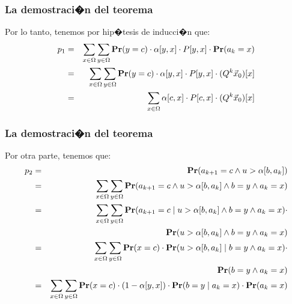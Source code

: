 \documentclass{beamer}
\newcommand{\pr}{{\rm {\bf Pr}}}
\begin{document}
	
	
	
	
	\begin{frame}
		\frametitle{La demostraci�n del teorema}
		
		{\footnotesize
			
			Por lo tanto, tenemos por hip�tesis de inducci�n que:
			\begin{eqnarray*}
				p_1 
				&=& \sum_{x\in\Omega}\sum_{y\in\Omega} \pr(y=c) \cdot 
				\alpha[y,x] \cdot P[y,x] \cdot \pr(a_k=x) \\
				&=& \sum_{x\in\Omega}\sum_{y\in\Omega} \pr(y=c) \cdot
				\alpha[y,x] \cdot P[y,x] \cdot (Q^k \vec x_0)[x] \\
				&=& \sum_{x\in\Omega} 
				\alpha[c,x] \cdot P[c,x] \cdot (Q^k \vec x_0)[x]
			\end{eqnarray*}
			
		}
		
	\end{frame}
	
	
	
	
	
	\begin{frame}
		\frametitle{La demostraci�n del teorema}
		
		{\footnotesize
			
			
			Por otra parte, tenemos que:
			\begin{eqnarray*}
				p_2 
				&=& \pr(a_{k+1}=c \wedge u > \alpha[b,a_k]) \\
				&=& \sum_{x\in\Omega}\sum_{y\in\Omega}
				\pr(a_{k+1}=c \wedge u > \alpha[b,a_k] \wedge b=y \wedge a_k=x) \\
				&=& \sum_{x\in\Omega}\sum_{y\in\Omega}
				\pr(a_{k+1}=c \mid u > \alpha[b,a_k] \wedge b=y \wedge a_k=x) \cdot\\
				&&  \hspace{121.5pt} \pr(u > \alpha[b,a_k] \wedge b=y \wedge a_k=x) \\
				&=& \sum_{x\in\Omega}\sum_{y\in\Omega} \pr(x=c) \cdot
				\pr(u > \alpha[b,a_k] \mid b=y \wedge a_k=x) \cdot\\
				&&  \hspace{178.5pt} \pr(b=y \wedge a_k=x) \\
				&=& \sum_{x\in\Omega}\sum_{y\in\Omega} \pr(x=c) \cdot
				(1 - \alpha[y,x]) \cdot \pr(b=y \mid a_k=x) \cdot \pr(a_k=x) 
			\end{eqnarray*}
			
		}
		
	\end{frame}
	
\end{document}
